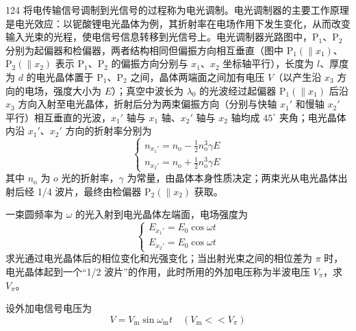 \begin{problem}[2020第37届全国中学生物理竞赛复赛][电光调制器原理与电路分析]{124}
    将电传输信号调制到光信号的过程称为电光调制。电光调制器的主要工作原理是电光效应：以铌酸锂电光晶体为例，其折射率在电场作用下发生变化，从而改变输入光束的光程，使电信号信息转移到光信号上。电光调制器光路图中，$\mathrm{P}_{1}$、$\mathrm{P}_{2}$ 分别为起偏器和检偏器，两者结构相同但偏振方向相互垂直（图中 $\mathrm{P}_{1}(\| x_{1})$、$\mathrm{P}_{2}(\| x_{2})$ 表示 $\mathrm{P}_{1}$、$\mathrm{P}_{2}$ 的偏振方向分别与 $x_{1}$、$x_{2}$ 坐标轴平行），长度为 $l$、厚度为 $d$ 的电光晶体置于 $\mathrm{P}_{1}$、$\mathrm{P}_{2}$ 之间，晶体两端面之间加有电压 $V$（以产生沿 $x_{3}$ 方向的电场，强度大小为 $E$）；真空中波长为 $\lambda_{0}$ 的光波经过起偏器 $\mathrm{P}_{1} (\| x_{1})$ 后沿 $x_{3}$ 方向入射至电光晶体，折射后分为两束偏振方向（分别与快轴 $x_{1}'$ 和慢轴 $x_{2}'$ 平行）相互垂直的光波，$x_{1}'$ 轴与 $x_{1}$ 轴、$x_{2}'$ 轴与 $x_{2}$ 轴均成 $45^{\circ}$ 夹角；电光晶体内沿 $x_{1}'$、$x_{2}'$ 方向的折射率分别为
    \begin{equation}
        \left\{ \begin{array}{l} n_{x_{1}'} = n_{\mathrm{o}} - \frac{1}{2} n_{\mathrm{o}}^{3} \gamma E \\ n_{x_{2}'} = n_{\mathrm{o}} + \frac{1}{2} n_{\mathrm{o}}^{3} \gamma E \end{array} \right.
    \end{equation}
    其中 $n_{\mathrm{o}}$ 为 $o$ 光的折射率，$\gamma$ 为常量，由晶体本身性质决定；两束光从电光晶体出射后经 1/4 波片，最终由检偏器 $\mathrm{P}_{2} (\| x_{2})$ 获取。
    \begin{subproblem}
        一束圆频率为 $\omega$ 的光入射到电光晶体左端面，电场强度为
        \begin{equation}
            \left\{ \begin{array}{l} E_{x_{1}'} = E_{0} \cos \omega t \\ E_{x_{2}'} = E_{0} \cos \omega t \end{array} \right.
        \end{equation}
        求光通过电光晶体后的相位变化和光强变化；当出射光束之间的相位差为 $\pi$ 时，电光晶体起到一个“1/2 波片”的作用，此时所用的外加电压称为半波电压 $V_{\pi}$，求 $V_{\pi}$。
    \end{subproblem}
    \begin{subproblem}
        设外加电信号电压为
        \begin{equation}
            V = V_{\mathrm{m}} \sin \omega_{\mathrm{m}} t \quad (V_{\mathrm{m}} << V_{\pi})

\end{equation}
\end{subproblem}
\end{problem}
